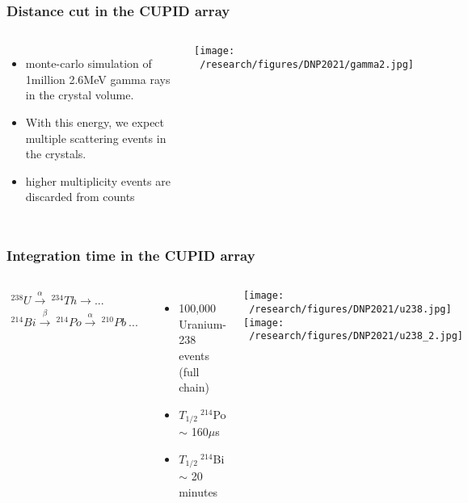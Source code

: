 \documentclass{beamer}
\begin{document}
	\begin{frame}
		\frametitle{Distance cut in the CUPID array}
		\begin{columns}[c] %
			
			\begin{itemize}
				\setlength\itemsep{2em}
				\item monte-carlo simulation of 1million 2.6MeV gamma rays in the crystal volume.
				\item With this energy, we expect multiple scattering events in the crystals.
				\item higher multiplicity events are discarded from counts
			\end{itemize}
			
			
			\texttt{[image: ~/research/figures/DNP2021/gamma2.jpg]}
			
			
		\end{columns}
	\end{frame}



	\begin{frame}
		\frametitle{Integration time in the CUPID array}
		\begin{columns}[c] %
			
			\begin{eqnarray*}
			^{238}U \xrightarrow{\alpha} \  ^{234}Th \xrightarrow \  ... \\ ^{214}Bi \xrightarrow{\beta} \  ^{214}Po \xrightarrow{\alpha} \ ^{210}Pb \ ...
			\end{eqnarray*}
			\begin{itemize}
				\setlength\itemsep{2em}
				\item 100,000 Uranium-238 events (full chain)
				\item $T_{1/2} \ ^{214}$Po $\sim$ 160$\mu$s
				\item $T_{1/2} \ ^{214}$Bi $\sim$ 20 minutes
			\end{itemize}
			
			\hspace*{0.3cm}\texttt{[image: ~/research/figures/DNP2021/u238.jpg]}
			\medskip\medskip
			\hspace*{0.3cm}\texttt{[image: ~/research/figures/DNP2021/u238\_2.jpg]}
			
		\end{columns}
	\end{frame}
\end{document}
